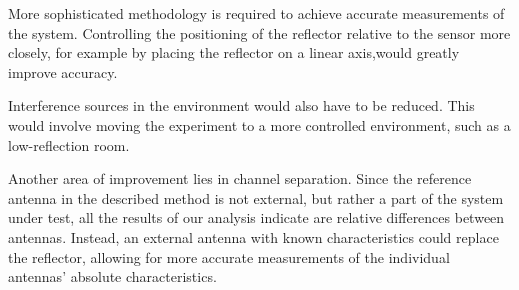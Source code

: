 More sophisticated methodology is required to achieve accurate measurements of the system.
Controlling the positioning of the reflector relative to the sensor more closely,
for example by placing the reflector on a linear axis,would greatly improve accuracy.

Interference sources in the environment would also have to be reduced.
This would involve moving the experiment to a more controlled environment,
such as a low-reflection room.

Another area of improvement lies in channel separation.
Since the reference antenna in the described method is not external,
but rather a part of the system under test,
all the results of our analysis indicate are relative differences between antennas.
Instead, an external antenna with known characteristics could replace the reflector,
allowing for more accurate measurements of the individual antennas' absolute characteristics.



